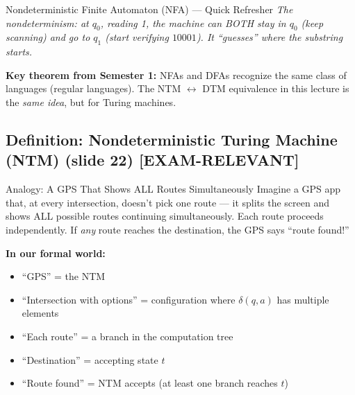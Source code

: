 \documentclass[11pt,a4paper]{article}
\newcommand{\kemark}{\textcolor{red!70!black}{\textbf{[EXAM-RELEVANT]}}}
\begin{document}
\begin{definitionbox}{Nondeterministic Finite Automaton (NFA) --- Quick Refresher}
\textit{The nondeterminism: at $q_0$, reading 1, the machine can BOTH stay in $q_0$ (keep scanning) and go to $q_1$ (start verifying $10001$). It ``guesses'' where the substring starts.}

\textbf{Key theorem from Semester 1:} NFAs and DFAs recognize the same class of languages (regular languages). The NTM $\leftrightarrow$ DTM equivalence in this lecture is the \textit{same idea}, but for Turing machines.
\end{definitionbox}

\subsection{Definition: Nondeterministic Turing Machine (NTM) (slide 22) \kemark}

\begin{notebox}{Analogy: A GPS That Shows ALL Routes Simultaneously}
Imagine a GPS app that, at every intersection, doesn't pick one route --- it splits the screen and shows ALL possible routes continuing simultaneously. Each route proceeds independently. If \textit{any} route reaches the destination, the GPS says ``route found!''

\textbf{In our formal world:}
\begin{itemize}[nosep]
\item ``GPS'' = the NTM
\item ``Intersection with options'' = configuration where $\delta(q, a)$ has multiple elements
\item ``Each route'' = a branch in the computation tree
\item ``Destination'' = accepting state $t$
\item ``Route found'' = NTM accepts (at least one branch reaches $t$)
\end{itemize}
\end{notebox}
\end{document}
